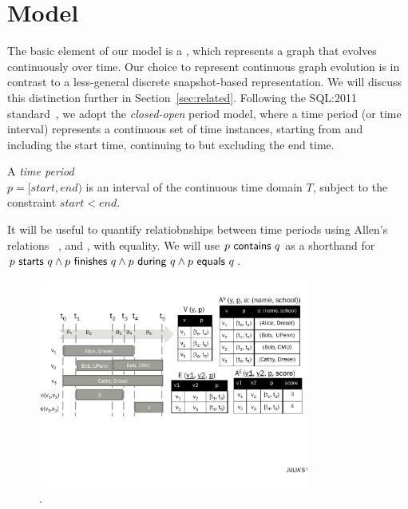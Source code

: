 \section{Model}
\label{sec:model}

The basic element of our model is a \tg, which represents a graph that
evolves continuously over time.  Our choice to represent continuous
graph evolution is in contrast to a less-general discrete
snapshot-based representation.  We will discuss this distinction
further in Section~\ref{sec:related}.  Following the SQL:2011
standard~\cite{DBLP:journals/sigmod/KulkarniM12}, we adopt the {\em
  closed-open} period model, where a time period (or time interval)
represents a continuous set of time instances, starting from and
including the start time, continuing to but excluding the end time.

\begin{definition}
A {\em time period} \\$p = [start, end)$ is an interval of the
  continuous time domain $T$, subject to the constraint $start < end$.
\label{def:period} 
\end{definition}

It will be useful to quantify relatiobnships between time periods
using Allen's relations~\cite{allen83} ,
 and , with equality.  We will
use $p~\mathsf{contains}~q$ as a shorthand for $p~\mathsf{starts}~q
\wedge p~\mathsf{finishes}~q \wedge p~\mathsf{during}~q \wedge
p~\mathsf{equals}~q$.

\begin{figure}
\centering
\includegraphics[width=3.5in]{figs/T1_rel_tab.pdf}
\caption{\tg {}.}
\label{fig:tg_ve}
\end{figure}

